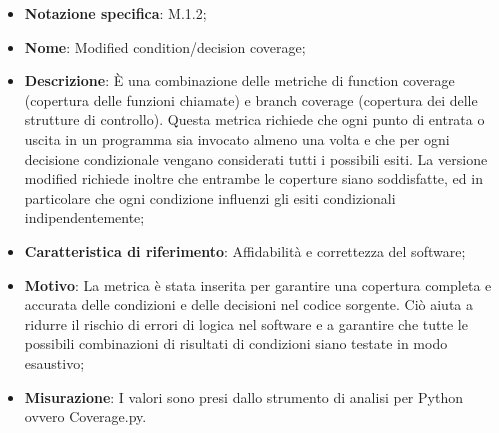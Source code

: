 \begin{itemize}
    \item \textbf{Notazione specifica}: M.1.2;
    \item \textbf{Nome}: Modified condition/decision coverage;
    \item \textbf{Descrizione}: È una combinazione delle metriche di function coverage (copertura delle funzioni chiamate) e branch coverage (copertura dei  delle strutture di controllo). Questa metrica richiede che ogni punto di entrata o uscita in un programma sia invocato almeno una volta e che per ogni decisione condizionale vengano considerati tutti i possibili esiti. La versione modified richiede inoltre che entrambe le coperture siano soddisfatte, ed in particolare che ogni condizione influenzi gli esiti condizionali indipendentemente;
    \item \textbf{Caratteristica di riferimento}: Affidabilità e correttezza del software;
    \item \textbf{Motivo}: La metrica è stata inserita per garantire una copertura completa e accurata delle condizioni e delle decisioni nel codice sorgente. Ciò aiuta a ridurre il rischio di errori di logica nel software e a garantire che tutte le possibili combinazioni di risultati di condizioni siano testate in modo esaustivo;
    \item \textbf{Misurazione}: I valori sono presi dallo strumento di analisi per Python ovvero Coverage.py.
\end{itemize}
